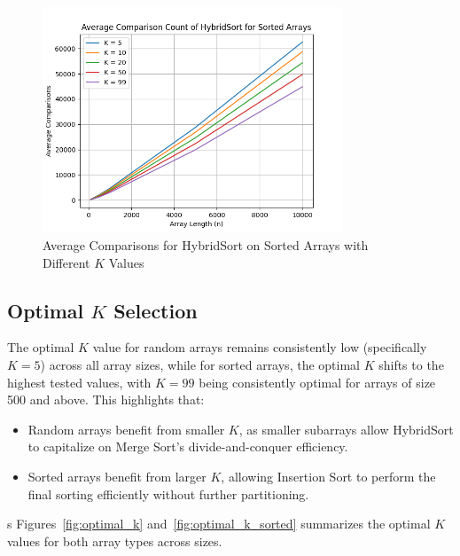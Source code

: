 \documentclass{article}
\begin{document}
\begin{figure}[!ht]
    \centering
    \includegraphics[width=0.8\textwidth]{../average_comparisons_sorted.png}
    \caption{Average Comparisons for HybridSort on Sorted Arrays with Different \( K \) Values}\label{fig:sorted_comparisons}
\end{figure}

\subsection{Optimal \( K \) Selection}
The optimal \( K \) value for random arrays remains consistently low (specifically \( K = 5 \)) across all array sizes, while for sorted arrays, the optimal \( K \) shifts to the highest tested values, with \( K = 99 \) being consistently optimal for arrays of size 500 and above. This highlights that:
\begin{itemize}
    \item Random arrays benefit from smaller \( K \), as smaller subarrays allow HybridSort to capitalize on Merge Sort’s divide-and-conquer efficiency.
    \item Sorted arrays benefit from larger \( K \), allowing Insertion Sort to perform the final sorting efficiently without further partitioning.
\end{itemize}
s
Figures~\ref{fig:optimal_k} and~\ref{fig:optimal_k_sorted} summarizes the optimal \( K \) values for both array types across sizes.
\end{document}
